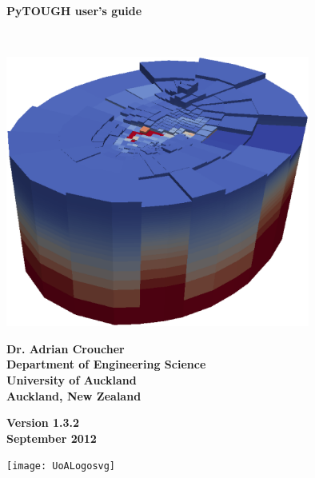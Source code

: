 \begin{titlepage}

\begin{center}

\bigskip\

\textbf{\Huge{PyTOUGH user's guide}}

\bigskip\

\includegraphics[width=0.75\textwidth]{coverpic}

\bigskip

\textbf{\large{Dr. Adrian Croucher\\
Department of Engineering Science\\
University of Auckland\\
Auckland, New Zealand}}

\bigskip

\textbf{\large{Version 1.3.2\\
September 2012}}

\bigskip
\bigskip
\bigskip
\bigskip
\bigskip

\texttt{[image: UoALogosvg]}

\end{center}
\end{titlepage}

